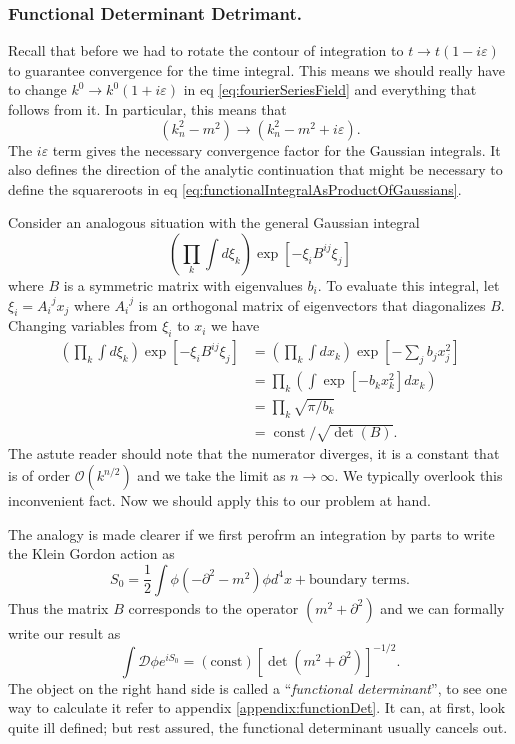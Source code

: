 \subsubsection{Functional Determinant Detrimant.}
Recall that before we had to rotate the contour of integration to
$t\to t(1-i\varepsilon)$ to guarantee convergence for the time
integral. This means we should really have to change $k^0\to
k^{0}(1+i\varepsilon)$ in eq \eqref{eq:fourierSeriesField} and
everything that follows from it. In particular, this means that
\begin{equation}%
(k_{n}^{2}-m^{2})\to(k_{n}^{2}-m^{2}+i\varepsilon).
\end{equation}
The $i\varepsilon$ term gives the necessary convergence factor
for the Gaussian integrals. It also defines the direction of the
analytic continuation that might be necessary to define the
squareroots in eq \eqref{eq:functionalIntegralAsProductOfGaussians}.

Consider an analogous situation with the general Gaussian
integral
\begin{equation}%
\left(\prod_{k}\int d\xi_{k}\right)\exp[-\xi_{i}B^{ij}\xi_{j}]
\end{equation}
where $B$ is a symmetric matrix with eigenvalues $b_i$. To
evaluate this integral, let $\xi_{i} = {A_{i}}^{j}x_{j}$ where
${A_{i}}^{j}$ is an orthogonal matrix of eigenvectors that
diagonalizes $B$. Changing variables from $\xi_i$ to $x_i$ we
have
\begin{subequations}
\begin{align}
\left(\prod_{k}\int d\xi_{k}\right)\exp[-\xi_{i}B^{ij}\xi_{j}] &= \left(\prod_{k}\int dx_{k}\right)\exp[-\sum_{j}b_{j}x_{j}^{2}]\\
&= \prod_{k}\left(\int \exp[-b_{k}x_{k}^{2}]dx_{k}\right)\\
&= \prod_{k}\sqrt{\pi/b_{k}}\\
&= \operatorname{const}/\sqrt{\det(B)}.
\end{align}
\end{subequations}
The astute reader should note that the numerator diverges, it is
a constant that is of order $\mathcal{O}(k^{n/2})$ and we take
the limit as $n\to\infty$. We typically overlook this
inconvenient fact. Now we should apply this to our problem at hand.

The analogy is made clearer if we first perofrm an integration by
parts to write the Klein Gordon action as
\begin{equation}%
S_{0}=\frac{1}{2}\int\phi(-\partial^{2}-m^{2})\phi d^{4}x +
\text{boundary terms}.
\end{equation}
Thus the matrix $B$ corresponds to the operator
$(m^2+\partial^2)$ and we can formally write our result as
\begin{equation}%
\int\mathcal{D}\phi e^{iS_{0}} = (\text{const})[\det(m^2+\partial^2)]^{-1/2}.
\end{equation}
The object on the right hand side is called a ``\emph{functional
  determinant}'', to see one way to calculate it refer to
appendix \ref{appendix:functionDet}. It can, at first, look quite
ill defined; but rest assured, the functional determinant usually
cancels out.

